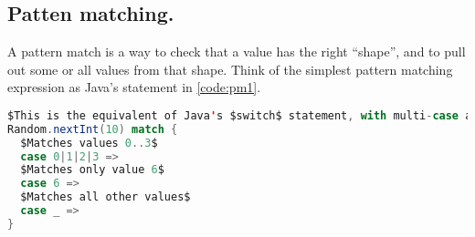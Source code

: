 \documentclass[10 pt]{article}
\begin{document}






\subsection{Patten matching.} 
A pattern match is a way to check that a value has the right ``shape'', and to pull out some or all values from that shape. Think of the simplest pattern matching expression as Java's  statement in \autoref{code:pm1}.

\begin{lstlisting}[caption={Pattern matching}, label={code:pm1}, language=Scala, escapechar=$]
$This is the equivalent of Java's $switch$ statement, with multi-case and a default case.$
Random.nextInt(10) match {
  $Matches values 0..3$
  case 0|1|2|3 =>
  $Matches only value 6$
  case 6 =>
  $Matches all other values$
  case _ =>
}
\end{lstlisting}
\end{document}
